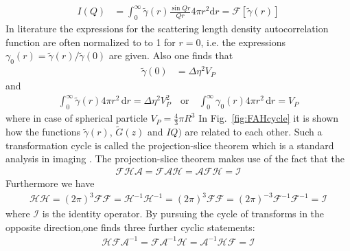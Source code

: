 \begin{align}
I(Q) &= \int_0^\infty \tilde{\gamma}(r) \frac{\sin Qr}{Qr}4\pi r^2\mathrm{d}r = \mathcal{F}\left[\tilde{\gamma}(r)\right]
\end{align}
In literature the expressions for the scattering length density autocorrelation function are often normalized to to 1 for $r=0$, i.e. the expressions $\gamma_0(r)=\tilde{\gamma}(r)/\tilde{\gamma}(0)$ are given. Also one finds that
\begin{align}
\tilde{\gamma}(0)&=\Delta\eta^2 V_P
\end{align}
and
\begin{align}
\int_0^\infty \tilde{\gamma}(r) 4\pi r^2 \, \mathrm{d}r =\Delta\eta^2 V_P^2 \quad \mbox{or} \quad  \int_0^\infty \gamma_0(r) 4\pi r^2 \, \mathrm{d}r = V_P
\end{align}
where in case of spherical particle $V_P=\frac43 \pi R^3$
In Fig.\ \ref{fig:FAHcycle} it is shown how the functions $\tilde{\gamma}(r)$, $\tilde{G}(z)$ and $IQ)$ are related to each other. Such a transformation cycle is called the projection-slice theorem which is a standard analysis in imaging \cite{Bracewell2003}. The projection-slice theorem makes use of the fact that the
\begin{align}
\mathcal{F}\mathcal{H}\mathcal{A}=\mathcal{F}\mathcal{A}\mathcal{H}=\mathcal{A}\mathcal{F}\mathcal{H}=\mathcal{I}
\end{align}
Furthermore we have
\begin{align}
\mathcal{HH}=(2\pi)^3\mathcal{FF}=\mathcal{H}^{-1}\mathcal{H}^{-1}=(2\pi)^3\mathcal{FF}=(2\pi)^{-3}\mathcal{F}^{-1}\mathcal{F}^{-1}=\mathcal{I}
\end{align}
where $\mathcal{I}$ is the identity operator.
By pursuing the cycle of transforms in the opposite direction,one finds three further cyclic statements:
\begin{align}
\mathcal{HF}\mathcal{A}^{-1}=\mathcal{F}\mathcal{A}^{-1}\mathcal{H}=\mathcal{A}^{-1}\mathcal{HF}=\mathcal{I}
\end{align}

